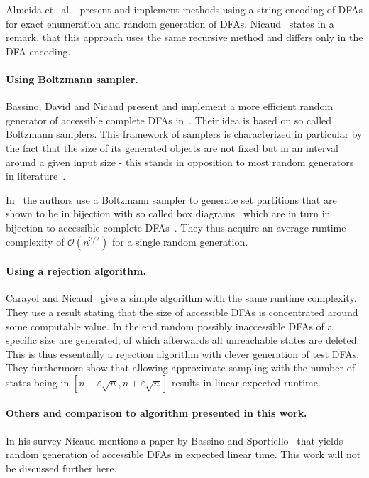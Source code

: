 Almeida et.\ al.~\cite{AAA09, AMR09, RMA05} present and implement methods using a string-encoding of DFAs for exact enumeration and random generation of DFAs. Nicaud~\cite[p. 11]{Nic14} states in a remark, that this approach uses the same recursive method and differs only in the DFA encoding.

\paragraph*{Using Boltzmann sampler.}

Bassino, David and Nicaud present and implement a more efficient random generator of accessible complete DFAs in~\cite{BDN07, BN07}. Their idea is based on so called Boltzmann samplers. This framework of samplers is characterized in particular by the fact that the size of its generated objects are not fixed but in an interval around a given input size - this stands in opposition to most random generators in literature~\cite[p. 2]{DFL04}.

In~\cite{BN07} the authors use a Boltzmann sampler to generate set partitions that are shown to be in bijection with so called box diagrams~\cite[p. 8]{BN07} which are in turn in bijection to accessible complete DFAs~\cite[p. 4]{BN07}. They thus acquire an average runtime complexity of $\mathcal{O}(n^{3/2})$ for a single random generation.

\paragraph*{Using a rejection algorithm.}

Carayol and Nicaud~\cite{CN12} give a simple algorithm with the same runtime complexity. They use a result stating that the size of accessible DFAs is concentrated around some computable value. In the end random possibly inaccessible DFAs of a specific size are generated, of which afterwards all unreachable states are deleted. This is thus essentially a rejection algorithm with clever generation of test DFAs. They furthermore show that allowing approximate sampling with the number of states being in $[n-\varepsilon\sqrt{n}, n+\varepsilon\sqrt{n}]$ results in linear expected runtime.

\paragraph*{Others and comparison to algorithm presented in this work.}

In his survey Nicaud mentions a paper by Bassino and Sportiello~\cite{BS13} that yields random generation of accessible DFAs in expected linear time. This work will not be discussed further here.


